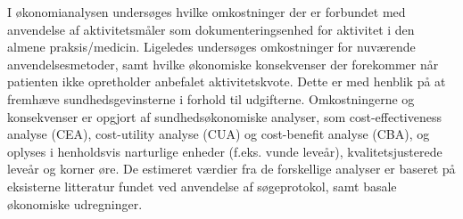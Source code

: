 \documentclass[11pt,a4paper]{report}
\begin{document}
I økonomianalysen undersøges hvilke omkostninger der er forbundet med anvendelse af aktivitetsmåler som dokumenteringsenhed for aktivitet i den almene praksis/medicin.
Ligeledes undersøges omkostninger for nuværende anvendelsesmetoder, samt hvilke økonomiske konsekvenser der forekommer når patienten ikke opretholder anbefalet aktivitetskvote.
Dette er med henblik på at fremhæve sundhedsgevinsterne i forhold til udgifterne.   
Omkostningerne og konsekvenser er opgjort af sundhedsøkonomiske analyser, som cost-effectiveness analyse (CEA), cost-utility analyse (CUA) og cost-benefit analyse (CBA), og oplyses i henholdsvis narturlige enheder (f.eks. vunde leveår), kvalitetsjusterede leveår og korner øre. 
De estimeret værdier fra de forskellige analyser er baseret på eksisterne litteratur fundet ved anvendelse af søgeprotokol, samt basale økonomiske udregninger.    

 

 
 
\end{document}
